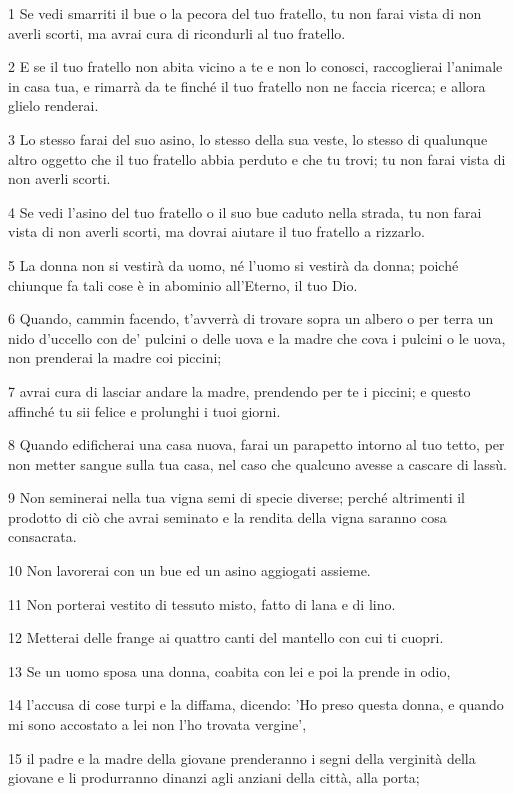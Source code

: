 \par 1 Se vedi smarriti il bue o la pecora del tuo fratello, tu non farai vista di non averli scorti, ma avrai cura di ricondurli al tuo fratello.
\par 2 E se il tuo fratello non abita vicino a te e non lo conosci, raccoglierai l'animale in casa tua, e rimarrà da te finché il tuo fratello non ne faccia ricerca; e allora glielo renderai.
\par 3 Lo stesso farai del suo asino, lo stesso della sua veste, lo stesso di qualunque altro oggetto che il tuo fratello abbia perduto e che tu trovi; tu non farai vista di non averli scorti.
\par 4 Se vedi l'asino del tuo fratello o il suo bue caduto nella strada, tu non farai vista di non averli scorti, ma dovrai aiutare il tuo fratello a rizzarlo.
\par 5 La donna non si vestirà da uomo, né l'uomo si vestirà da donna; poiché chiunque fa tali cose è in abominio all'Eterno, il tuo Dio.
\par 6 Quando, cammin facendo, t'avverrà di trovare sopra un albero o per terra un nido d'uccello con de' pulcini o delle uova e la madre che cova i pulcini o le uova, non prenderai la madre coi piccini;
\par 7 avrai cura di lasciar andare la madre, prendendo per te i piccini; e questo affinché tu sii felice e prolunghi i tuoi giorni.
\par 8 Quando edificherai una casa nuova, farai un parapetto intorno al tuo tetto, per non metter sangue sulla tua casa, nel caso che qualcuno avesse a cascare di lassù.
\par 9 Non seminerai nella tua vigna semi di specie diverse; perché altrimenti il prodotto di ciò che avrai seminato e la rendita della vigna saranno cosa consacrata.
\par 10 Non lavorerai con un bue ed un asino aggiogati assieme.
\par 11 Non porterai vestito di tessuto misto, fatto di lana e di lino.
\par 12 Metterai delle frange ai quattro canti del mantello con cui ti cuopri.
\par 13 Se un uomo sposa una donna, coabita con lei e poi la prende in odio,
\par 14 l'accusa di cose turpi e la diffama, dicendo: 'Ho preso questa donna, e quando mi sono accostato a lei non l'ho trovata vergine',
\par 15 il padre e la madre della giovane prenderanno i segni della verginità della giovane e li produrranno dinanzi agli anziani della città, alla porta;
